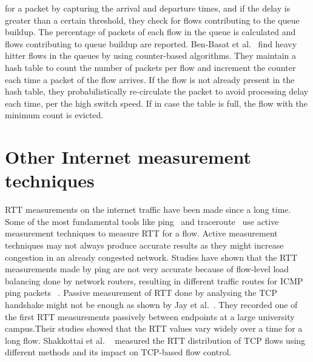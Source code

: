 for a packet by capturing the arrival and departure times, and if the delay is greater than a certain threshold, they check for flows contributing to the queue buildup. The percentage of packets of each flow in the queue is calculated and flows contributing to queue buildup are reported. Ben-Basat et al.~\cite{probabilisticrecirculation-icnp2018} find heavy hitter flows in the queues by using counter-based algorithms. They maintain a hash table to count the number of packets per flow and increment the counter each time a packet of the flow arrives. If the flow is not already present in the hash table, they probabilistically re-circulate the packet to avoid processing delay each time, per the high switch speed. If in case the table is full, the flow with the minimum count is evicted.

\section{Other Internet measurement techniques}

RTT measurements on the internet traffic have been made since a long time. Some of the most fundamental tools like ping~\cite{iputils} and traceroute~\cite{inetutils} use active measurement techniques to measure RTT for a flow. Active measurement techniques may not always produce accurate results as they might increase congestion in an already congested network. Studies have shown that the RTT measurements made by ping are not very accurate because of flow-level load balancing done by network routers, resulting in different traffic routes for ICMP ping packets ~\cite{paris2tokyoping-imc13}. Passive measurement of RTT done by analysing the TCP handshake might not be enough as shown by Jay et al.~\cite{tcprtt-imc03}. They recorded one of the first RTT measurements passively between endpoints at a large university campus.Their studies showed that the RTT values vary widely over a time for a long flow. Shakkottai et al. ~\cite{2004-shakkottai-t20} measured the RTT distribution of TCP flows using different methods and its impact on TCP-based flow control.

